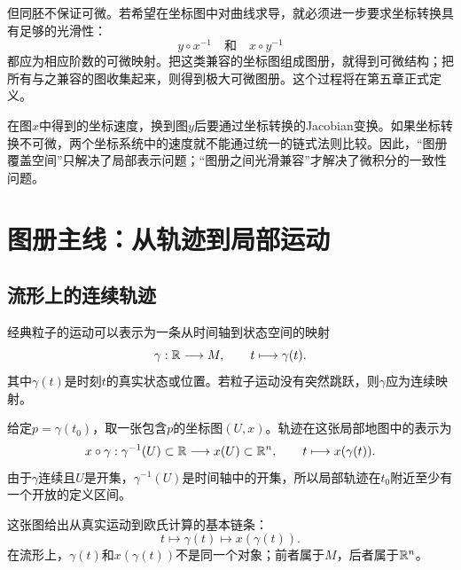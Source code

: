 但同胚不保证可微。若希望在坐标图中对曲线求导，就必须进一步要求坐标转换具有足够的光滑性：
\[
    y\circ x^{-1}
    \quad\text{和}\quad
    x\circ y^{-1}
\]
都应为相应阶数的可微映射。把这类兼容的坐标图组成图册，就得到可微结构；把所有与之兼容的图收集起来，则得到极大可微图册。这个过程将在第五章正式定义。

\begin{remark}[为什么坐标兼容性重要]
在图$x$中得到的坐标速度，换到图$y$后要通过坐标转换的Jacobian变换。如果坐标转换不可微，两个坐标系统中的速度就不能通过统一的链式法则比较。因此，“图册覆盖空间”只解决了局部表示问题；“图册之间光滑兼容”才解决了微积分的一致性问题。
\end{remark}


\section{图册主线：从轨迹到局部运动}

\subsection{流形上的连续轨迹}

经典粒子的运动可以表示为一条从时间轴到状态空间的映射
\[
    \gamma:\mathbb{R}\longrightarrow M,\qquad
    t\longmapsto\gamma(t).
\]
其中$\gamma(t)$是时刻$t$的真实状态或位置。若粒子运动没有突然跳跃，则$\gamma$应为连续映射。

给定$p=\gamma(t_0)$，取一张包含$p$的坐标图$(U,x)$。轨迹在这张局部地图中的表示为
\[
    x\circ\gamma:
    \gamma^{-1}(U)\subset\mathbb{R}
    \longrightarrow x(U)\subset\mathbb{R}^n,
    \qquad
    t\longmapsto x(\gamma(t)).
\]
由于$\gamma$连续且$U$是开集，$\gamma^{-1}(U)$是时间轴中的开集，所以局部轨迹在$t_0$附近至少有一个开放的定义区间。

\begin{center}
\end{center}

这张图给出从真实运动到欧氏计算的基本链条：
\[
    t\longmapsto\gamma(t)\longmapsto x(\gamma(t)).
\]
在流形上，$\gamma(t)$和$x(\gamma(t))$不是同一个对象；前者属于$M$，后者属于$\mathbb{R}^n$。

